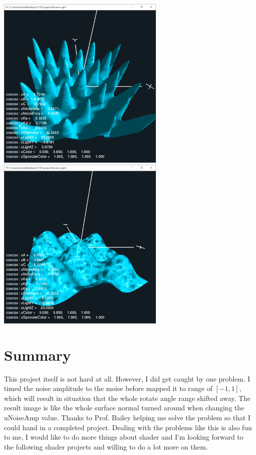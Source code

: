 \documentclass[letterpaper,14pt,titlepage,fleqn]{article}
\begin{document}
\begin{center}
	\includegraphics[width=3.2in]{lightxyz.jpg}
	\includegraphics*[width=3.2in]{ads.jpg}
\end{center}

\section{Summary}
This project itself is not hard at all. However, I did get caught by one problem. I timed the noise amplitude to the moise before mapped it to range of $[-1, 1]$, which will result in situation that the whole rotate angle range shifted away. The result image is like the whole surface normal turned around when changing the uNoiseAmp value. Thanks to Prof. Bailey helping me solve the problem so that I could hand in a completed project. Dealing with the problems like this is also fun to me, I would like to do more things about shader and I'm looking forward to the following shader projects and willing to do a lot more on them.
\end{document}
